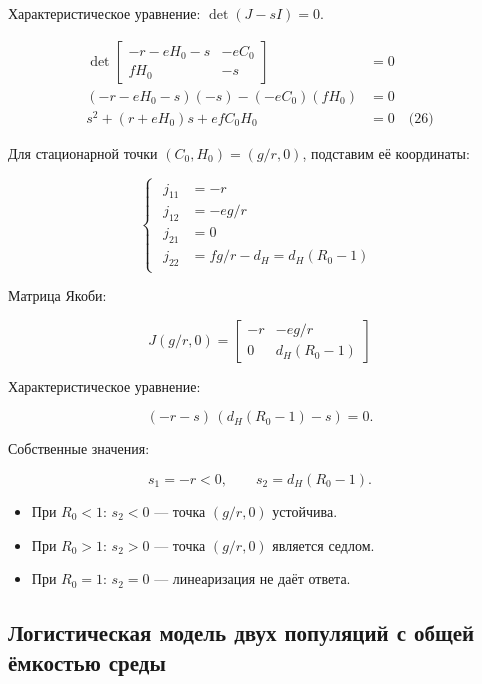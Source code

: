 \documentclass[a4paper, 14pt]{extarticle}
\begin{document}
Характеристическое уравнение: $\det(J - sI) = 0$.

\begin{align*}
    \det \begin{bmatrix} 
        -r - e H_0 - s & -e C_0 \\ 
        f H_0 & -s 
    \end{bmatrix} &= 0 \\
    (-r - e H_0 - s)(-s) - (-e C_0)(f H_0) &= 0 \\
    s^2 + (r + e H_0)s + e f C_0 H_0 &= 0 \quad \text{(26)}
\end{align*}

Для стационарной точки $(C_0, H_0) = (g/r, 0)$, подставим её координаты:

\begin{equation}
    \begin{cases}
        \begin{aligned}
    j_{11} &= -r \\
    j_{12} &= -e g/r \\
    j_{21} &= 0 \\
    j_{22} &= f g/r - d_H = d_H(R_0 - 1)
        \end{aligned}
    \end{cases}
\end{equation}

Матрица Якоби:

\[
J(g/r, 0) = 
\begin{bmatrix} 
    -r & -e g/r \\ 
    0 & d_H(R_0 - 1)
\end{bmatrix}
\]

Характеристическое уравнение:

\[
(-r - s)\,(d_H(R_0 - 1) - s)=0.
\]

Собственные значения:

\[
s_1 = -r < 0, \qquad s_2 = d_H(R_0 - 1).
\]

\begin{itemize}
    \item При $R_0 < 1$: $s_2 < 0$ — точка $(g/r,0)$ устойчива.
    \item При $R_0 > 1$: $s_2 > 0$ — точка $(g/r,0)$ является седлом.
    \item При $R_0 = 1$: $s_2 = 0$ — линеаризация не даёт ответа.
\end{itemize}

\newpage

\subsection{Логистическая модель двух популяций с общей ёмкостью среды}
\end{document}
